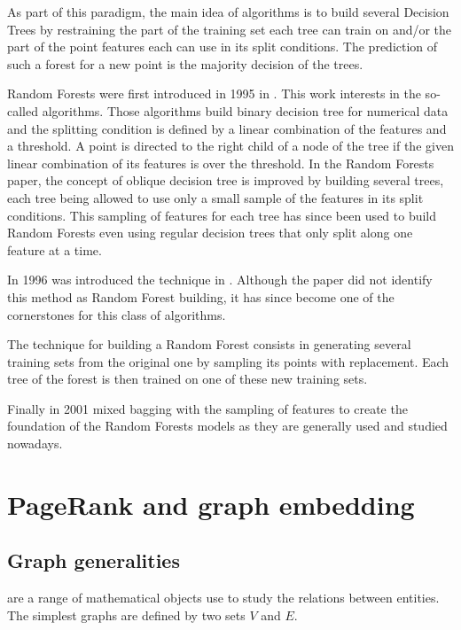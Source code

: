 As part of this paradigm, the main idea of  algorithms is to build several Decision Trees by restraining the part of the training set each tree can train on and/or the part of the point features each can use in its split conditions. The prediction of such a forest for a new point is the majority decision of the trees.

Random Forests were first introduced in 1995 in \cite{ho1995_RandomDecisionForests}. This work interests in the so-called  algorithms. Those algorithms build binary decision tree for numerical data and the splitting condition is defined by a linear combination of the features and a threshold. A point is directed to the right child of a node of the tree if the given linear combination of its features is over the threshold. In the Random Forests paper, the concept of oblique decision tree is improved by building several trees, each tree being allowed to use only a small sample of the features in its split conditions. This sampling of features for each tree has since been used to build Random Forests even using regular decision trees that only split along one feature at a time.

In 1996 was introduced the  technique in \cite{breiman1996_BaggingPredictors}. Although the paper did not identify this method as Random Forest building, it has since become one of the cornerstones for this class of algorithms.

\begin{definition}[Bagging]
    The  technique for building a Random Forest consists in generating several training sets from the original one by sampling its points with replacement. Each tree of the forest is then trained on one of these new training sets.
\end{definition}

Finally in 2001 \cite{breiman2001_RandomForests} mixed bagging with the sampling of features to create the foundation of the Random Forests models as they are generally used and studied nowadays.

\section{PageRank and graph embedding}

\subsection{Graph generalities}
 are a range of mathematical objects use to study the relations between entities. The simplest graphs are defined by two sets $V$ and $E$. 

